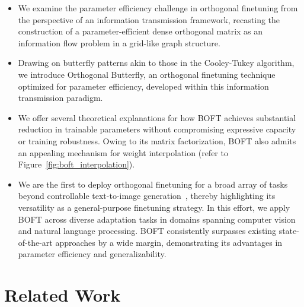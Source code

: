 \begin{itemize}[leftmargin=*,nosep]
    \item We examine the parameter efficiency challenge in orthogonal finetuning from the perspective of an information transmission framework, recasting the construction of a parameter-efficient dense orthogonal matrix as an information flow problem in a grid-like graph structure.
    \item Drawing on butterfly patterns akin to those in the Cooley-Tukey algorithm, we introduce Orthogonal Butterfly, an orthogonal finetuning technique optimized for parameter efficiency, developed within this information transmission paradigm.
    \item We offer several theoretical explanations for how BOFT achieves substantial reduction in trainable parameters without compromising expressive capacity or training robustness. Owing to its matrix factorization, BOFT also admits an appealing mechanism for weight interpolation (refer to Figure~\ref{fig:boft_interpolation}).
    \item We are the first to deploy orthogonal finetuning for a broad array of tasks beyond controllable text-to-image generation~\cite{qiu2023controlling}, thereby highlighting its versatility as a general-purpose finetuning strategy. In this effort, we apply BOFT across diverse adaptation tasks in domains spanning computer vision and natural language processing. BOFT consistently surpasses existing state-of-the-art approaches by a wide margin, demonstrating its advantages in parameter efficiency and generalizability.
\end{itemize}

\section{Related Work}

